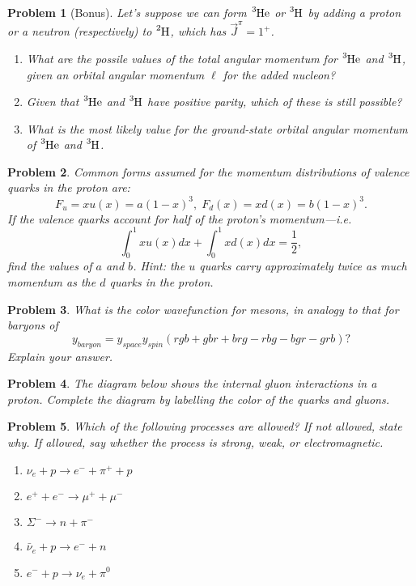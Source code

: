 \documentclass{article}
\newtheorem{plm}{Problem}
\begin{document}
\begin{plm}[Bonus]
  Let's suppose we can form $\ce{^{3}He}$ or $\ce{^{3}H}$ by adding a proton or a neutron (respectively) to $\ce{^{2}H}$,
  which has $\vec{J}^{\pi} = 1^{+}$.
  \begin{enumerate}
  \item What are the possile values of the total angular momentum for $\ce{^{3}He}$ and $\ce{^{3}H}$,
    given an orbital angular momentum $\ell$ for the added nucleon?
  \item Given that $\ce{^{3}He}$ and $\ce{^{3}H}$ have positive parity, which of these is still possible?
  \item What is the most likely value for the ground-state orbital angular momentum of $\ce{^{3}He}$ and $\ce{^{3}H}$.
  \end{enumerate}
\end{plm}
\begin{plm}
  Common forms assumed for the momentum distributions of valence quarks in the proton are:
  \[
    F_{u} = xu(x) = a(1 - x)^{3}, \; F_{d}(x) = xd(x) = b(1 - x)^{3}.
  \]
  If the valence quarks account for half of the proton's momentum---i.e.
  \[
    \int_{0}^{1}xu(x)dx + \int_{0}^{1}xd(x)dx = \frac{1}{2},
  \]
  find the values of $a$ and $b$.
  Hint: the $u$ quarks carry approximately twice as much momentum as the $d$ quarks in the proton.
\end{plm}
\begin{plm}
  What is the color wavefunction for mesons, in analogy to that for baryons of
  \[
    y_{baryon} = y_{space}y_{spin}(rgb + gbr + brg - rbg - bgr - grb)?
  \]
  Explain your answer.
\end{plm}
\begin{plm}
  The diagram below shows the internal gluon interactions in a proton.
  Complete the diagram by labelling the color of the quarks and gluons.
\end{plm}
\begin{plm}
  Which of the following processes are allowed?
  If not allowed, state why.
  If allowed, say whether the process is strong, weak, or electromagnetic.
  \begin{enumerate}
  \item $\nu_{e} + p \to e^{-} + \pi^{+} + p$
  \item $e^{+} + e^{-} \to \mu^{+} + \mu^{-}$
  \item $\Sigma^{-} \to n + \pi^{-}$
  \item $\bar{\nu}_{e} + p \to e^{-} + n$
  \item $e^{-} + p \to \nu_{e} + \pi^{0}$
  \end{enumerate}
\end{plm}
\end{document}
